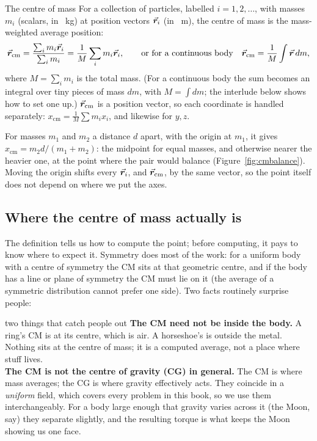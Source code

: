 \begin{defbox}{The centre of mass}
For a collection of particles, labelled $i=1,2,\dots$, with masses $m_i$ (scalars, in \SI{}{kg}) at
position vectors $\vec{\bm{r}}_i$ (in \SI{}{m}), the centre of mass is the mass-weighted average position:
\[
\vec{\bm{r}}_{\text{cm}}=\frac{\sum_i m_i\vec{\bm{r}}_i}{\sum_i m_i}=\frac{1}{M}\sum_i m_i\vec{\bm{r}}_i,
\qquad\text{or for a continuous body}\quad \vec{\bm{r}}_{\text{cm}}=\frac{1}{M}\int \vec{\bm{r}}\,dm,
\]
where $M=\sum_i m_i$ is the total mass. (For a continuous body the sum becomes an integral over tiny
pieces of mass $dm$, with $M=\int dm$; the interlude below shows how to set one up.) $\vec{\bm{r}}_{\text{cm}}$ is a position vector, so each
coordinate is handled separately: $x_{\text{cm}}=\frac{1}{M}\sum m_i x_i$, and likewise for $y,z$.
\end{defbox}

For masses $m_1$ and $m_2$ a distance $d$ apart, with the origin at $m_1$, it gives
$x_{\text{cm}}=m_2d/(m_1+m_2)$: the midpoint for equal masses, and otherwise nearer the heavier one, at the point where the pair would balance (Figure~\ref{fig:cmbalance}). Moving
the origin shifts every $\vec{\bm{r}}_i$, and $\vec{\bm{r}}_{\text{cm}}$, by the same vector, so the point itself does not
depend on where we put the axes.

\begin{figure}[htbp]
\centering
{}
\end{figure}

\subsection{Where the centre of mass actually is}

The definition tells us how to compute the point; before computing, it pays to know where to expect it.
Symmetry does most of the work: for a uniform body with a centre of symmetry the CM sits at that geometric centre, and if the body
has a line or plane of symmetry the CM must lie on it (the average of a symmetric distribution cannot prefer one side).
Two facts routinely surprise people:

\begin{trapbox}{two things that catch people out}
\textbf{The CM need not be inside the body.} A ring's CM is at its centre, which is air. A horseshoe's
is outside the metal. Nothing sits at the centre of mass; it is a computed average, not a place where
stuff lives. \\[3pt]
\textbf{The CM is not the centre of gravity (CG) in general.} The CM is where mass averages; the CG is where
gravity effectively acts. They coincide in a \emph{uniform} field, which covers every problem in this book, so
we use them interchangeably. For a body large enough that gravity varies across it (the Moon, say) they
separate slightly, and the resulting torque is what keeps the Moon showing us one face.
\end{trapbox}

